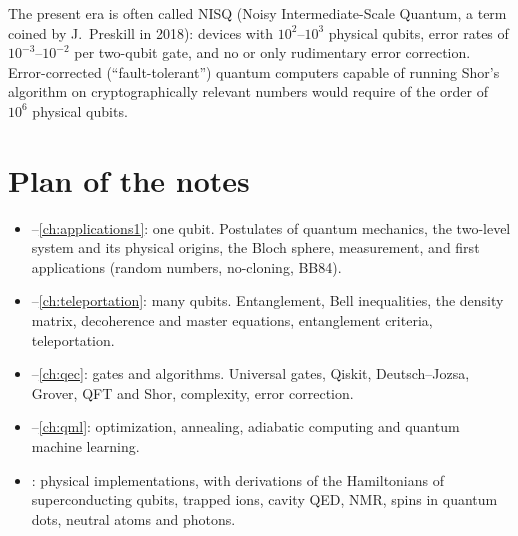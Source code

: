 The present era is often called NISQ (Noisy Intermediate-Scale Quantum, a term coined by J.~Preskill in 2018):
devices with $10^2$--$10^3$ physical qubits, error rates of $10^{-3}$--$10^{-2}$ per two-qubit gate, and no or only
rudimentary error correction. Error-corrected (``fault-tolerant'') quantum computers capable of running Shor's
algorithm on cryptographically relevant numbers would require of the order of $10^6$ physical qubits.

\section{Plan of the notes}
\begin{itemize}
  \item {}--\cref{ch:applications1}: one qubit. Postulates of quantum mechanics, the two-level system and
  its physical origins, the Bloch sphere, measurement, and first applications (random numbers, no-cloning, BB84).
  \item {}--\cref{ch:teleportation}: many qubits. Entanglement, Bell inequalities, the density
  matrix, decoherence and master equations, entanglement criteria, teleportation.
  \item {}--\cref{ch:qec}: gates and algorithms. Universal gates, Qiskit, Deutsch--Jozsa, Grover, QFT and Shor,
  complexity, error correction.
  \item {}--\cref{ch:qml}: optimization, annealing, adiabatic computing and quantum machine learning.
  \item {}: physical implementations, with derivations of the Hamiltonians of superconducting
  qubits, trapped ions, cavity QED, NMR, spins in quantum dots, neutral atoms and photons.
\end{itemize}
